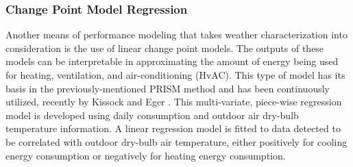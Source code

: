 \subsubsection{Change Point Model Regression}
\label{sec:changepointmodels}

Another means of performance modeling that takes weather characterization into consideration is the use of linear change point models. The outputs of these models can be interpretable in approximating the amount of energy being used for heating, ventilation, and air-conditioning (HvAC). This type of model has its basis in the previously-mentioned PRISM method and has been continuously utilized, recently by Kissock and Eger \cite{Kelly_Kissock_2008}. This multi-variate, piece-wise regression model is developed using daily consumption and outdoor air dry-bulb temperature information. A linear regression model is fitted to data detected to be correlated with outdoor dry-bulb air temperature, either positively for cooling energy consumption or negatively for heating energy consumption.